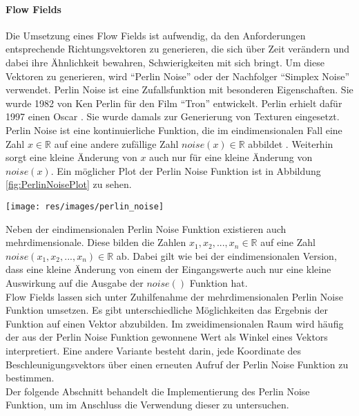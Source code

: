 \documentclass[11pt,a4paper]{article}
\begin{document}
\paragraph{Flow Fields}
Die Umsetzung eines Flow Fields ist aufwendig, da den Anforderungen entsprechende Richtungsvektoren zu generieren, die sich über Zeit verändern und dabei ihre Ähnlichkeit bewahren, Schwierigkeiten mit sich bringt. Um diese Vektoren zu generieren, wird ``Perlin Noise'' oder der Nachfolger ``Simplex Noise'' verwendet. Perlin Noise ist eine Zufallsfunktion mit besonderen Eigenschaften. Sie wurde 1982 von Ken Perlin für den Film ``Tron'' entwickelt. Perlin erhielt dafür 1997 einen Oscar \cite{bcc7190da8e90284b4e790817b8eed4ee3ea6cffbe5a23ef07a000ca5628ffbc}. Sie wurde damals zur Generierung von Texturen eingesetzt.\\
Perlin Noise ist eine kontinuierliche Funktion, die im  eindimensionalen Fall eine Zahl $x \in \mathbb{R}$ auf eine andere zufällige Zahl $noise(x) \in \mathbb{R}$ abbildet \cite{25a05da283ffd9d4bdda94c308ccf3a8759f22373b368f895cbef2e9186ab646}. Weiterhin sorgt eine kleine Änderung von $x$ auch nur für eine kleine Änderung von $noise(x)$. Ein möglicher Plot der Perlin Noise Funktion ist in Abbildung \ref{fig:PerlinNoisePlot} zu sehen.
\begin{SCfigure}[][h]
\hspace{110pt}
\texttt{[image: res/images/perlin\_noise]}
\caption[Perlin Noise Plot]{\\Perlin Noise Plot aus \cite[Kap.\\Introduction]{nature_of_code}}
\label{fig:PerlinNoisePlot}
\end{SCfigure}
\noindent
Neben der eindimensionalen Perlin Noise Funktion existieren auch mehrdimensionale. Diese bilden die Zahlen $x_1, x_2, ..., x_n \in \mathbb{R}$ auf eine Zahl $noise(x_1, x_2, ..., x_n) \in \mathbb{R}$ ab. Dabei gilt wie bei der eindimensionalen Version, dass eine kleine Änderung von einem der Eingangswerte auch nur eine kleine Auswirkung auf die Ausgabe der $noise()$ Funktion hat.\\
Flow Fields lassen sich unter Zuhilfenahme der mehrdimensionalen Perlin Noise Funktion umsetzen. Es gibt unterschiedliche Möglichkeiten das Ergebnis der Funktion auf einen Vektor abzubilden. Im zweidimensionalen Raum wird häufig der aus der Perlin Noise Funktion gewonnene Wert als Winkel eines Vektors interpretiert. Eine andere Variante besteht darin,  jede Koordinate des Beschleunigungsvektors über einen erneuten Aufruf der Perlin Noise Funktion zu bestimmen.\\
Der folgende Abschnitt behandelt die Implementierung des Perlin Noise Funktion, um im Anschluss die Verwendung dieser zu untersuchen.
\end{document}
